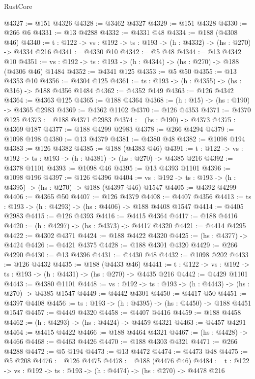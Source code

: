 \begin{lexlean}{RustCore}
\begin{coremodule}
@4327 := @151 @4326
@4328 := @3462 @4327
@4329 := @151 @4328
@4330 := @266 @6
@4331 := @13 @4288
@4332 := @4331 @48
@4334 := @188 (@4308 @46)
@4340 := {t : @122} -> {vs : @192} -> {ts : @193} -> (h : @4332) -> (hs : @270) -> @4334 @216
@4341 := @4330 @10
@4342 := @5 @48
@4344 := @13 @4342 @10
@4351 := {vs : @192} -> {ts : @193} -> (h : @4344) -> (hs : @270) -> @188 (@4306 @46) @1484
@4352 := @4341 @125
@4353 := @5 @50
@4355 := @13 @4353 @10
@4356 := @4304 @125
@4361 := {ts : @193} -> (h : @4355) -> (hs : @316) -> @188 @4356 @1484
@4362 := @4352 @149
@4363 := @126 @4342
@4364 := @4363 @125
@4365 := @188 @4364
@4368 := (h : @15) -> (hs : @190) -> @4365 @2983
@4369 := @4362 @1102
@4370 := @126 @4353
@4371 := @4370 @125
@4373 := @188 @4371 @2983
@4374 := (hs : @190) -> @4373
@4375 := @4369 @187
@4377 := @188 @4299 @2983
@4378 := @266 @4294
@4379 := @1098 @198
@4380 := @13 @4379
@4381 := @4380 @48
@4382 := @1098 @194
@4383 := @126 @4382
@4385 := @188 (@4383 @46)
@4391 := {t : @122} -> {vs : @192} -> {ts : @193} -> (h : @4381) -> (hs : @270) -> @4385 @216
@4392 := @4378 @1101
@4393 := @1098 @46
@4395 := @13 @4393 @1101
@4396 := @1098 @196
@4397 := @126 @4396
@4404 := {vs : @192} -> {ts : @193} -> (h : @4395) -> (hs : @270) -> @188 (@4397 @46) @1547
@4405 := @4392 @4299
@4406 := @4365 @50
@4407 := @126 @4379
@4408 := @4407 @4356
@4413 := {ts : @193} -> (h : @4293) -> (hs : @4406) -> @188 @4408 @1547
@4414 := @4405 @2983
@4415 := @126 @4393
@4416 := @4415 @4364
@4417 := @188 @4416
@4420 := (h : @4297) -> (hs : @4373) -> @4417 @4320
@4421 := @4414 @4295
@4422 := @4302 @4371
@4424 := @188 @4422 @4320
@4425 := (hs : @4377) -> @4424
@4426 := @4421 @4375
@4428 := @188 @4301 @4320
@4429 := @266 @4290
@4430 := @13 @4396
@4431 := @4430 @48
@4432 := @1098 @202
@4433 := @126 @4432
@4435 := @188 (@4433 @46)
@4441 := {t : @122} -> {vs : @192} -> {ts : @193} -> (h : @4431) -> (hs : @270) -> @4435 @216
@4442 := @4429 @1101
@4443 := @4380 @1101
@4448 := {vs : @192} -> {ts : @193} -> (h : @4443) -> (hs : @270) -> @4385 @1547
@4449 := @4442 @4301
@4450 := @4417 @50
@4451 := @4397 @4408
@4456 := {ts : @193} -> (h : @4395) -> (hs : @4450) -> @188 @4451 @1547
@4457 := @4449 @4320
@4458 := @4407 @4416
@4459 := @188 @4458
@4462 := (h : @4293) -> (hs : @4424) -> @4459 @4321
@4463 := @4457 @4291
@4464 := @4415 @4422
@4466 := @188 @4464 @4321
@4467 := (hs : @4428) -> @4466
@4468 := @4463 @4426
@4470 := @188 @4303 @4321
@4471 := @266 @4288
@4472 := @5 @194
@4473 := @13 @4472
@4474 := @4473 @48
@4475 := @5 @208
@4476 := @126 @4475
@4478 := @188 (@4476 @46)
@4484 := {t : @122} -> {vs : @192} -> {ts : @193} -> (h : @4474) -> (hs : @270) -> @4478 @216

\end{coremodule}
\end{lexlean}
